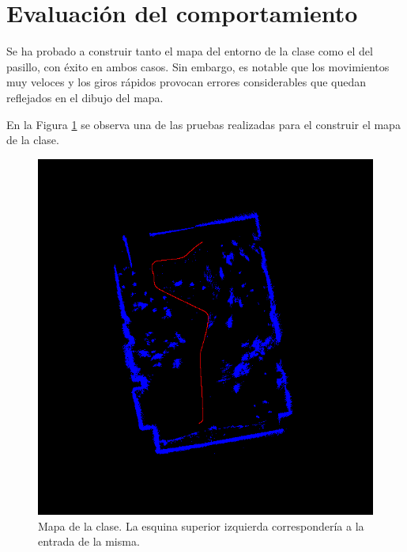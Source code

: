 \section{Evaluación del comportamiento}

Se ha probado a construir tanto el mapa del entorno de la clase como el del pasillo, con éxito en ambos casos. Sin embargo, es notable que los movimientos muy veloces y los giros rápidos provocan errores considerables que quedan reflejados en el dibujo del mapa.

En la Figura \ref{fig:clase} se observa una de las pruebas realizadas para el construir el mapa de la clase.

\begin{figure}[h]
    \centering
    \includegraphics[scale=0.35]{images/mapa_clase.png}
    \caption{Mapa de la clase. La esquina superior izquierda correspondería a la entrada de la misma.}
    \label{fig:clase}
\end{figure}